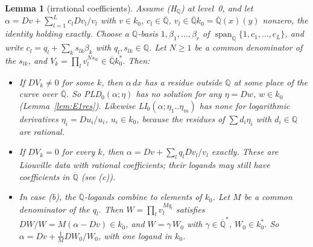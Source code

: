 \documentclass[11pt]{article}
\newtheorem{lemma}[theorem]{Lemma}
\theoremstyle{definition}
\theoremstyle{remark}
\newcommand{\Q}{\mathbb{Q}}
\newcommand{\Qbar}{\overline{\mathbb{Q}}}
\begin{document}
\begin{lemma}[irrational coefficients]\label{lem:E1irr}
Assume (H$_\Q$) at level~0, and let $\alpha=Dv+\sum_{l=1}^Lc_lDv_l/v_l$ with $v\in k_0$,
$c_l\in\Qbar$, $v_l\in\Qbar k_0=\Qbar(x)(y)$ nonzero, the identity holding exactly. Choose a
$\Q$-basis $1,\beta_1,\dots,\beta_r$ of $\operatorname{span}_\Q\{1,c_1,\dots,c_L\}$, and write
$c_l=q_l+\sum_ks_{lk}\beta_k$ with $q_l,s_{lk}\in\Q$. Let $N\ge1$ be a common denominator of the
$s_{lk}$, and $V_k=\prod_lv_l^{Ns_{lk}}\in\Qbar k_0^*$. Then:
\begin{itemize}
\item[(a)] If $DV_k\ne0$ for some $k$, then $\alpha\,dx$ has a residue outside $\Q$ at some place
  of the curve over $\Qbar$. So PLD$_0(\alpha;\eta)$ has no solution for any $\eta=Dw$, $w\in k_0$
  (Lemma~\ref{lem:E1res}). Likewise LI$_0(\alpha;\eta_1..\eta_m)$ has none for logarithmic
  derivatives $\eta_i=Du_i/u_i$, $u_i\in k_0$, because the residues of $\sum d_i\eta_i$ with
  $d_i\in\Q$ are rational.
\item[(b)] If $DV_k=0$ for every $k$, then $\alpha=Dv+\sum_lq_lDv_l/v_l$ exactly. These are
  Liouville data with rational coefficients; their logands may still have coefficients in
  $\Qbar$ (see (c)).
\item[(c)] In case (b), the $\Qbar$-logands combine to elements of $k_0$. Let $M$ be a common
  denominator of the $q_l$. Then $W=\prod_lv_l^{Mq_l}$ satisfies $DW/W=M(\alpha-Dv)\in k_0$,
  and $W=\gamma\,W_0$ with $\gamma\in\Qbar^*$, $W_0\in k_0^*$. So $\alpha=Dv+\tfrac1MDW_0/W_0$,
  with one logand in $k_0$.
\end{itemize}
\end{lemma}
\end{document}
